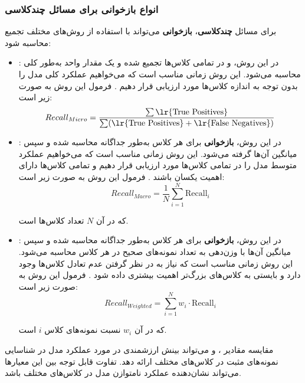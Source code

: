 \subsubsection{انواع بازخوانی برای مسائل چندکلاسی}


برای مسائل \textbf{چندکلاسی}، \textbf{بازخوانی} می‌تواند با استفاده از روش‌های مختلف تجمیع محاسبه شود:

\begin{itemize}
	\item \textbf{}: در این روش، \textbf{} و \textbf{} در تمامی کلاس‌ها تجمیع شده و یک مقدار واحد به‌طور کلی محاسبه می‌شود. این روش زمانی مناسب است که می‌خواهیم عملکرد کلی مدل را بدون توجه به اندازه کلاس‌ها مورد ارزیابی قرار دهیم \cite{ref_sokolova2009}. فرمول این روش به صورت زیر است:
	\begin{equation}
		Recall_{Micro} = \frac{\sum \text{\lr{True Positives}}}{\sum (\text{\lr{True Positives}} + \text{\lr{False Negatives}})}
	\end{equation}
	
	\item \textbf{}: در این روش، \textbf{بازخوانی} برای هر کلاس به‌طور جداگانه محاسبه شده و سپس میانگین آن‌ها گرفته می‌شود. این روش زمانی مناسب است که می‌خواهیم عملکرد متوسط مدل را در تمامی کلاس‌ها مورد ارزیابی قرار دهیم و تمامی کلاس‌ها دارای اهمیت یکسان باشند \cite{ref_sokolova2009}. فرمول این روش به صورت زیر است:
	\begin{equation}
		Recall_{Macro} = \frac{1}{N} \sum_{i=1}^{N} \text{Recall}_i
	\end{equation}
	
	که در آن \( N \) تعداد کلاس‌ها است.
	
	\item \textbf{}: در این روش، \textbf{بازخوانی} برای هر کلاس به‌طور جداگانه محاسبه شده و سپس میانگین آن‌ها با وزن‌دهی به تعداد نمونه‌های صحیح در هر کلاس محاسبه می‌شود. این روش زمانی مناسب است که نیاز به در نظر گرفتن عدم تعادل کلاس‌ها وجود دارد و بایستی به کلاس‌های بزرگ‌تر اهمیت بیشتری داده شود \cite{ref_sokolova2009}. فرمول این روش به صورت زیر است:
	\begin{equation}
		Recall_{Weighted} = \sum_{i=1}^{N} w_i \cdot \text{Recall}_i
	\end{equation}
	
	که در آن \( w_i \) نسبت نمونه‌های کلاس \( i \) است.
	
\end{itemize}

مقایسه مقادیر ،  و  می‌تواند بینش ارزشمندی در مورد عملکرد مدل در شناسایی نمونه‌های مثبت در کلاس‌های مختلف ارائه دهد. تفاوت قابل توجه بین این معیارها می‌تواند نشان‌دهنده عملکرد نامتوازن مدل در کلاس‌های مختلف باشد.

